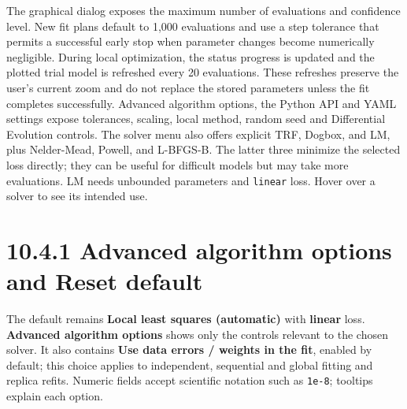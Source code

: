 \documentclass[
  10pt,
  a4paper,
  oneside]{scrreprt}
\begin{document}
The graphical dialog exposes the maximum number of evaluations and
confidence level. New fit plans default to 1,000 evaluations and use a
step tolerance that permits a successful early stop when parameter
changes become numerically negligible. During local optimization, the
status progress is updated and the plotted trial model is refreshed
every 20 evaluations. These refreshes preserve the user's current zoom
and do not replace the stored parameters unless the fit completes
successfully. Advanced algorithm options, the Python API and YAML
settings expose tolerances, scaling, local method, random seed and
Differential Evolution controls. The solver menu also offers explicit
TRF, Dogbox, and LM, plus Nelder-Mead, Powell, and L-BFGS-B. The latter
three minimize the selected loss directly; they can be useful for
difficult models but may take more evaluations. LM needs unbounded
parameters and \texttt{linear} loss. Hover over a solver to see its
intended use.

\hypertarget{advanced-algorithm-options-and-reset-default}{%
\section{10.4.1 Advanced algorithm options and Reset
default}\label{advanced-algorithm-options-and-reset-default}}

The default remains \textbf{Local least squares (automatic)} with
\textbf{linear} loss. \textbf{Advanced algorithm options} shows only the
controls relevant to the chosen solver. It also contains \textbf{Use
data errors / weights in the fit}, enabled by default; this choice
applies to independent, sequential and global fitting and replica
refits. Numeric fields accept scientific notation such as \texttt{1e-8};
tooltips explain each option.
\end{document}
